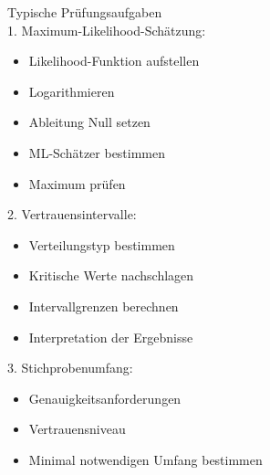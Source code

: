\begin{KR}{Typische Prüfungsaufgaben}\\
1. Maximum-Likelihood-Schätzung:
   \begin{itemize}
     \item Likelihood-Funktion aufstellen
     \item Logarithmieren
     \item Ableitung Null setzen
     \item ML-Schätzer bestimmen
     \item Maximum prüfen
   \end{itemize}

2. Vertrauensintervalle:
   \begin{itemize}
     \item Verteilungstyp bestimmen
     \item Kritische Werte nachschlagen
     \item Intervallgrenzen berechnen
     \item Interpretation der Ergebnisse
   \end{itemize}

3. Stichprobenumfang:
   \begin{itemize}
     \item Genauigkeitsanforderungen
     \item Vertrauensniveau
     \item Minimal notwendigen Umfang bestimmen
   \end{itemize}
\end{KR}